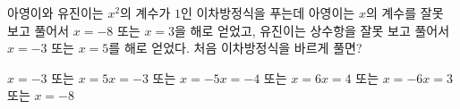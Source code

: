 아영이와 유진이는 $x^2$의 계수가 $1$인 이차방정식을 푸는데 아영이는 $x$의 계수를 잘못 보고 풀어서 $x=-8$ 또는 $x=3$을 해로 얻었고, 유진이는 상수항을 잘못 보고 풀어서 $x=-3$ 또는 $x=5$를 해로 얻었다. 처음 이차방정식을 바르게 풀면?
\begin{choicesii}{$x=-3$ 또는 $x=5$}{$x=-3$ 또는 $x=-5$}{$x=-4$ 또는 $x=6$}{$x=4$ 또는 $x=-6$}{$x=3$ 또는 $x=-8$}\end{choicesii}
